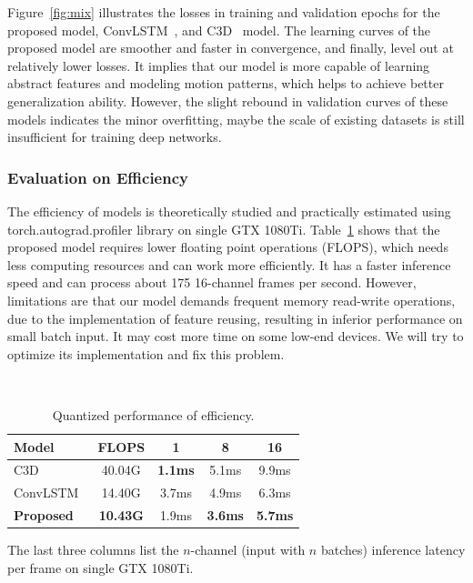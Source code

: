 \documentclass[10pt,twocolumn,letterpaper]{article}
\begin{document}
Figure~\ref{fig:mix} illustrates the losses in training and validation epochs for the proposed model, ConvLSTM~\cite{convlstm_sudh}, and C3D~\cite{3dcnn_1} model.
The learning curves of the proposed model are smoother and faster in convergence, and finally, level out at relatively lower losses.
It implies that our model is more capable of learning abstract features and modeling motion patterns, which helps to achieve better generalization ability.
However, the slight rebound in validation curves of these models indicates the minor overfitting, maybe the scale of existing datasets is still insufficient for training deep networks. 

\subsubsection{Evaluation on Efficiency}

The efficiency of models is theoretically studied and practically estimated using torch.autograd.profiler library on single GTX 1080Ti.
Table~\ref{table:efficiency} shows that the proposed model requires lower floating point operations (FLOPS), which needs less computing resources and can work more efficiently.
It has a faster inference speed and can process about 175 16-channel frames per second.
However, limitations are that our model demands frequent memory read-write operations, due to the implementation of feature reusing, resulting in inferior performance on small batch input.
It may cost more time on some low-end devices.
We will try to optimize its implementation and fix this problem.


\begin{table}
\begin{center}
\caption{Quantized performance of efficiency.}
~\label{table:efficiency}
\begin{tabular}{lcccc}
\hline
\textbf{Model} & \textbf{FLOPS} & \textbf{1} & \textbf{8} & \textbf{16}\\
\hline\hline
C3D~\cite{3dcnn_1} & 40.04G & \textbf{1.1ms} & 5.1ms & 9.9ms \\
ConvLSTM~\cite{convlstm_sudh} & 14.40G & 3.7ms & 4.9ms & 6.3ms \\
\textbf{Proposed} & \textbf{10.43G} & 1.9ms & \textbf{3.6ms} & \textbf{5.7ms} \\
\hline
\end{tabular}
\end{center}
\footnotesize
The last three columns list the $n$-channel (\ie input with $n$ batches) inference latency per frame on single GTX 1080Ti.
\end{table}
\end{document}
